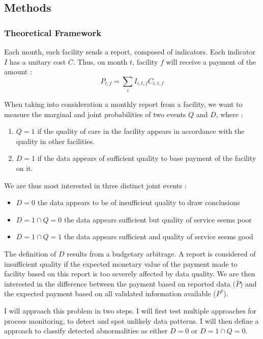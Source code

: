 \subsection{Methods}
\label{sec:aim3_Methods}

\subsubsection{Theoretical Framework}
\label{sec:aim3_theoretical_framework}

Each month, each facility sends a report, composed of indicators. Each indicator $I$ has a unitary cost $C$. Thus, on month $t$, facility $f$ will receive a payment of the amount :
$$P_{t,f} = \sum_i I_{i,t,f} C_{i,t,f}$$

When taking into consideration a monthly report from a facility, we want to measure the marginal and joint probabilities of two events $Q$ and $D$, where :
\begin{enumerate}
	\item $Q = 1$ if the quality of care in the facility appears in accordance with the quality in other facilities.
	\item $D = 1$ if the data appears of sufficient quality to base payment of the facility on it.
\end{enumerate}

We are thus most interested in three distinct joint events :
\begin{itemize}
	\item $D = 0$ the data appears to be of insufficient quality to draw conclusions
	\item $D = 1 \cap Q = 0$ the data appears sufficient but quality of service seems poor
	\item $D = 1 \cap Q = 1$ the data appears sufficient and quality of service seems good
\end{itemize}


The definition of $D$ results from a budgetary arbitrage. A report is considered of insufficient quality if the expected monetary value of the payment made to facility based on this report is too severely affected by data quality. We are then interested in the difference between the payment based on reported data ($\bar{P}$) and the expected payment based on all validated information available ($P^{*}$).


I will approach this problem in two steps. I will first test multiple approaches for process monitoring, to detect and spot unlikely data patterns. I will then define a approach to classify detected abnormalities as either $D = 0$ or $D = 1 \cap Q = 0$.

